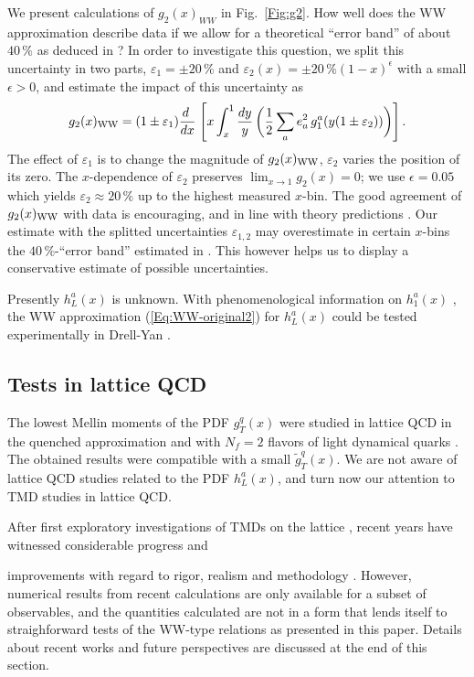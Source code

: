 \documentclass[a4paper,11pt]{article}
\newcommand{\blue}[1]{{\color{blue} #1}}
\newcommand{\be}{\begin{equation}}
\newcommand{\ee}{\end{equation}}
\begin{document}
We present calculations of $g_2(x)_{WW}$ in Fig.~\ref{Fig:g2}.
How well does the WW approximation describe data if we allow for a
theoretical ``error band'' of about $40\,\%$ as deduced in 
\cite{Accardi:2009au}? In order to investigate this question, 
we split this uncertainty in two parts, $\varepsilon_1=\pm 20\,\%$ and 
$\varepsilon_2(x)=\pm 20\,\%(1-x)^\epsilon$ with a small $\epsilon>0$,
and estimate the impact of this uncertainty as 
\be\label{Eq:g2-in-WW-model-violation}
    g_2(x)_{\rm WW} = (1\pm\varepsilon_1)\frac{ d\;}{ d x}\;\Biggl[
    x\int_x^1\frac{ d y}{y} \,\biggl(
    \frac12\sum_ae_a^2\,g_1^a(y(1\pm\varepsilon_2))\biggr)\Biggr]\,.
\ee
The effect of $\varepsilon_1$ is to change the magnitude
of $g_2(x)_{\rm WW}$, $\varepsilon_2$ varies the position of its zero.
The $x$-dependence of $\varepsilon_2$ preserves $\lim_{x\to1}g_2(x)= 0$; 
we use $\epsilon=0.05$ which yields $\varepsilon_2\approx 20\,\%$ up to 
the highest measured $x$-bin.
The good agreement of $g_2(x)_{\rm WW}$ with data is encouraging,
and in line with theory predictions \cite{Balla:1997hf}.
Our estimate with the splitted uncertainties 
$\varepsilon_{1,2}$ may overestimate in certain $x$-bins the 
$40\,\%$-``error band'' estimated in \cite{Accardi:2009au}. This however 
helps us to display a conservative estimate of possible uncertainties.

Presently $h_L^a(x)$ is unknown.
With phenomenological information on $h_1^a(x)$
\cite{Efremov:2006qm,Anselmino:2007fs,Anselmino:2008jk}, 
the WW approximation (\ref{Eq:WW-original2}) for $h_L^a(x)$ could 
be tested experimentally in Drell-Yan \cite{Koike:2008du}.


\subsection{Tests in lattice QCD}
\label{Sec-3.5:WW-lattice}

\blue{The lowest Mellin moments of the PDF $g_T^q(x)$ were studied in
lattice QCD in the quenched approximation \cite{Gockeler:2000ja} 
and with $N_f = 2$ flavors of light dynamical quarks \cite{Gockeler:2005vw}.
The obtained results were compatible with a small $\tilde{g}_T^q(x)$. 
We are not aware of lattice QCD studies related to the PDF $h_L^a(x)$,
and turn now our attention to TMD studies in lattice QCD.

After first exploratory investigations of TMDs on the lattice
\cite{Hagler:2009mb,Musch:2010ka}, recent years have witnessed considerable
progress and} improvements with regard to rigor, realism and methodology
\cite{Yoon:2017qzo, %
Engelhardt:2015xja,%
Ji:2014hxa,%
Musch:2011er%
}.
However, numerical results from recent calculations are only available 
for a subset of observables, and the quantities calculated are not in a 
form that lends itself to straighforward tests of the WW-type relations 
as presented in this paper. Details about recent works and future 
perspectives are discussed at the end of this section.
\end{document}
